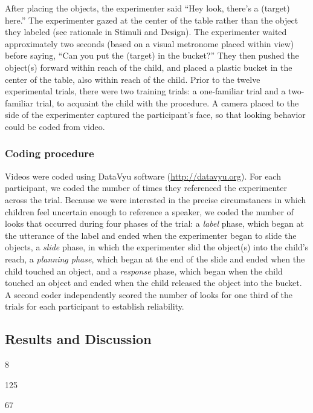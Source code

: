 \documentclass[10pt, letterpaper]{article}
\newenvironment{CodeChunk}{}{}
\begin{document}
After placing the objects, the experimenter said ``Hey look, there's a
(target) here.'' The experimenter gazed at the center of the table
rather than the object they labeled (see rationale in Stimuli and
Design). The experimenter waited approximately two seconds (based on a
visual metronome placed within view) before saying, ``Can you put the
(target) in the bucket?'' They then pushed the object(s) forward within
reach of the child, and placed a plastic bucket in the center of the
table, also within reach of the child. Prior to the twelve experimental
trials, there were two training trials: a one-familiar trial and a
two-familiar trial, to acquaint the child with the procedure. A camera
placed to the side of the experimenter captured the participant's face,
so that looking behavior could be coded from video.

\subsubsection{Coding procedure}\label{coding-procedure}

Videos were coded using DataVyu software (\url{http://datavyu.org}). For
each participant, we coded the number of times they referenced the
experimenter across the trial. Because we were interested in the precise
circumstances in which children feel uncertain enough to reference a
speaker, we coded the number of looks that occurred during four phases
of the trial: a \emph{label} phase, which began at the utterance of the
label and ended when the experimenter began to slide the objects, a
\emph{slide} phase, in which the experimenter slid the object(s) into
the child's reach, a \emph{planning phase}, which began at the end of
the slide and ended when the child touched an object, and a
\emph{response} phase, which began when the child touched an object and
ended when the child released the object into the bucket. A second coder
independently scored the number of looks for one third of the trials for
each participant to establish reliability.

\subsection{Results and Discussion}\label{results-and-discussion}

\begin{CodeChunk}
\begin{CodeOutput}
[1] 8
\end{CodeOutput}
\begin{CodeOutput}
[1] 125
\end{CodeOutput}
\begin{CodeOutput}
[1] 67
\end{CodeOutput}
\end{CodeChunk}
\end{document}
